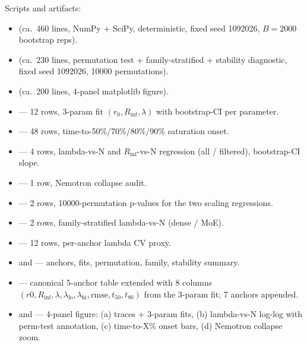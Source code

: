 Scripts and artifacts:
\begin{itemize}
\item {} (ca.\ 460 lines,
      NumPy + SciPy, deterministic, fixed seed 1092026, $B = 2000$
      bootstrap reps).
\item {} (ca.\ 230 lines,
      permutation test + family-stratified + stability diagnostic,
      fixed seed 1092026, 10000 permutations).
\item {} (ca.\ 200 lines,
      4-panel matplotlib figure).
\item {}
      --- 12 rows, 3-param fit $(r_0, R_\mathrm{inf}, \lambda)$ with
      bootstrap-CI per parameter.
\item {}
      --- 48 rows, time-to-50\%/70\%/80\%/90\% saturation onset.
\item {}
      --- 4 rows, lambda-vs-N and $R_\mathrm{inf}$-vs-N regression
      (all / filtered), bootstrap-CI slope.
\item {}
      --- 1 row, Nemotron collapse audit.
\item {}
      --- 2 rows, 10000-permutation p-values for the two scaling
      regressions.
\item {}
      --- 2 rows, family-stratified lambda-vs-N (dense / MoE).
\item {}
      --- 12 rows, per-anchor lambda CV proxy.
\item {}
      and --- anchors, fits,
      permutation, family, stability summary.
\item {} --- canonical
      5-anchor table extended with 8 columns
      $(r0, R_\mathrm{inf}, \lambda, \lambda_\mathrm{lo},
      \lambda_\mathrm{hi}, \mathrm{rmse}, t_{50}, t_{80})$
      from the 3-param fit; 7 anchors appended.
\item {} and
       --- 4-panel figure:
      (a) traces + 3-param fits, (b) lambda-vs-N log-log with
      perm-test annotation, (c) time-to-X\% onset bars, (d) Nemotron
      collapse zoom.
\end{itemize}


